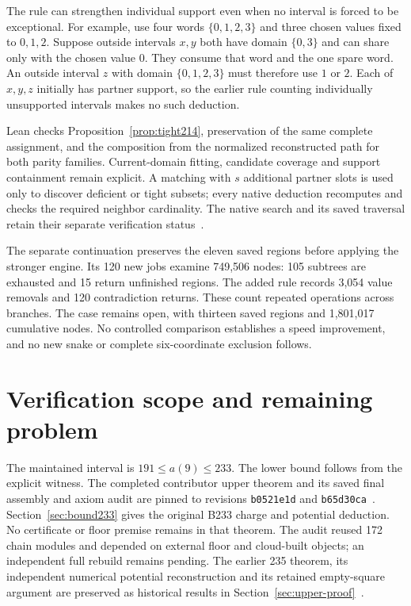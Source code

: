 \documentclass[11pt,a4paper]{article}
\theoremstyle{definition}
\theoremstyle{remark}
\begin{document}
The rule can strengthen individual support even when no interval is
forced to be exceptional. For example, use four words $\{0,1,2,3\}$
and three chosen values fixed to $0,1,2$. Suppose outside intervals
$x,y$ both have domain $\{0,3\}$ and can share only with the chosen
value $0$. They consume that word and the one spare word. An outside
interval $z$ with domain $\{0,1,2,3\}$ must therefore use $1$ or $2$.
Each of $x,y,z$ initially has partner support, so the earlier rule
counting individually unsupported intervals makes no such deduction.

Lean checks Proposition~\ref{prop:tight214}, preservation of the
same complete assignment, and the composition from the normalized
reconstructed path for both parity families. Current-domain fitting,
candidate coverage and support containment remain explicit.
A matching with $s$ additional partner slots
is used only to discover deficient or tight subsets; every native
deduction recomputes and checks the required neighbor cardinality.
The native search and its saved traversal retain their separate
verification status~\cite{research214}.

The separate continuation preserves the eleven saved regions before
applying the stronger engine. Its 120 new jobs examine 749,506 nodes:
105 subtrees are exhausted and 15 return unfinished regions. The added
rule records 3,054 value removals and 120 contradiction returns.
These count repeated operations across branches. The case remains
open, with thirteen saved regions and 1,801,017 cumulative nodes.
No controlled comparison establishes a speed improvement, and no new
snake or complete six-coordinate exclusion follows.

\section{Verification scope and remaining problem}\label{sec:verification}
The maintained interval is $191\le a(9)\le233$. The lower bound follows
from the explicit witness. The completed contributor upper theorem and
its saved final assembly and axiom audit are pinned to revisions
\texttt{b0521e1d} and \texttt{b65d30ca}~\cite{bound233archive}.
Section~\ref{sec:bound233} gives the original B233 charge and potential
deduction. No certificate or floor premise remains in that theorem.
The audit reused 172 chain modules and depended on external floor and
cloud-built objects; an independent full rebuild remains pending.
The earlier 235 theorem, its independent numerical potential reconstruction
and its retained empty-square argument are preserved as historical results
in Section~\ref{sec:upper-proof}~\cite{bound235archive}.
\end{document}
